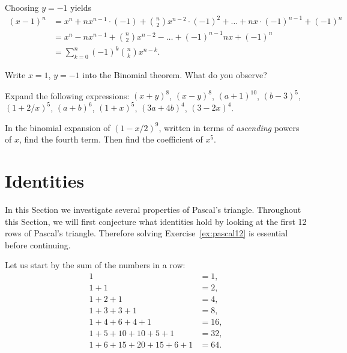 Choosing $y=-1$ yields 
\begin{align*}
(x-1)^n &= x^n + n x^{n-1}\cdot (-1) + \binom{n}{2} x^{n-2}\cdot (-1)^2 + \dots + n x \cdot (-1)^{n-1} + (-1)^n \\
&= x^n - n x^{n-1} + \binom{n}{2} x^{n-2} - \dots + (-1)^{n-1} n x  + (-1)^n \\
&= \sum_{k=0}^n (-1)^k \binom{n}{k} x^{n-k}. 
\end{align*}

\begin{exercise}\label{ex:binomial1-1}
Write $x=1$, $y=-1$ into the Binomial theorem. 
What do you observe? 
\end{exercise}

\begin{exercise}\label{ex:expandusingbinomialthm}
Expand the following expressions: 
$(x+y)^8$, $(x-y)^8$, $(a+1)^{10}$, $(b-3)^5$, $(1 + 2/x)^5$, $\left( a + b \right)^6$, $\left( 1 + x \right)^5$, $\left(3a + 4b \right)^4$, $\left( 3 - 2x \right)^4$. 
\end{exercise}

\begin{exercise}\label{ex:coefficientinbinomialthm}
In the binomial expansion of $\left( 1- x/2 \right)^9$, written in terms of \emph{ascending} powers of $x$, 
find the fourth term.
Then find the coefficient of $x^5$. 
\end{exercise}




\section{Identities}



In this Section we investigate several properties of Pascal's triangle. 
Throughout this Section, 
we will first conjecture what identities hold by looking at the first 12 rows of Pascal's triangle. 
Therefore solving Exercise~\ref{ex:pascal12} is essential before continuing. 

Let us start by the sum of the numbers in a row: 
\begin{align*}
1 & = 1, \\
1 + 1 &= 2, \\
1 + 2 + 1 &= 4, \\
1 + 3 + 3 + 1 &= 8, \\
1 + 4 + 6 + 4 + 1 &= 16, \\
1 + 5 + 10 + 10 + 5 + 1 &= 32, \\
1 + 6 + 15 + 20 + 15 + 6 + 1 &= 64. 
\end{align*}

